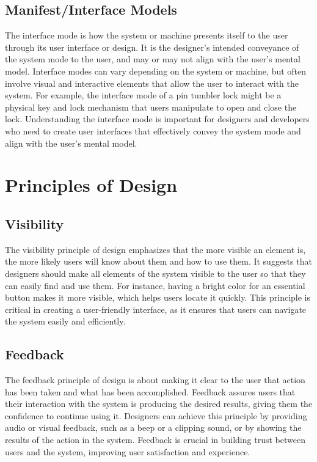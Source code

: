 \documentclass{article}
\begin{document}
\subsection{Manifest/Interface Models}
The interface mode is how the system or machine presents itself to the user through its user interface or design. It is the designer's intended conveyance of the system mode to the user, and may or may not align with the user's mental model. Interface modes can vary depending on the system or machine, but often involve visual and interactive elements that allow the user to interact with the system. For example, the interface mode of a pin tumbler lock might be a physical key and lock mechanism that users manipulate to open and close the lock. Understanding the interface mode is important for designers and developers who need to create user interfaces that effectively convey the system mode and align with the user's mental model.

\section{Principles of Design}

\subsection{Visibility}
The visibility principle of design emphasizes that the more visible an element is, the more likely users will know about them and how to use them. It suggests that designers should make all elements of the system visible to the user so that they can easily find and use them. For instance, having a bright color for an essential button makes it more visible, which helps users locate it quickly. This principle is critical in creating a user-friendly interface, as it ensures that users can navigate the system easily and efficiently.
\subsection{Feedback}
The feedback principle of design is about making it clear to the user that action has been taken and what has been accomplished. Feedback assures users that their interaction with the system is producing the desired results, giving them the confidence to continue using it. Designers can achieve this principle by providing audio or visual feedback, such as a beep or a clipping sound, or by showing the results of the action in the system. Feedback is crucial in building trust between users and the system, improving user satisfaction and experience.
\end{document}
